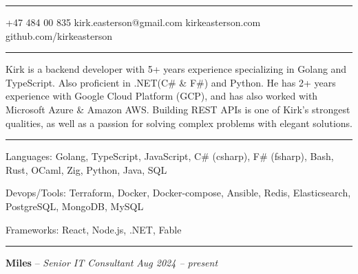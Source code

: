 \documentclass[10pt,letterpaper]{article}
\begin{document}
\begin{center}\hrule\end{center}


\noindent {} \hfill \small +47 484 00 835 \hfill {} \hfill kirk.easterson@gmail.com \hfill {} \hfill kirkeasterson.com \hfill {} \hfill github.com/kirkeasterson \hfill {}
\begin{center}\hrule\end{center}



Kirk is a backend developer with 5+ years experience specializing in Golang and TypeScript. Also proficient in .NET(C\# \& F\#) and Python. He has 2+ years experience with Google Cloud Platform (GCP), and has also worked with Microsoft Azure \& Amazon AWS. Building REST APIs is one of Kirk's strongest qualities, as well as a passion for solving complex problems with elegant solutions. \\


\begin{center}\hrule\end{center}



\inlineheadsection
{Languages:}
{Golang, TypeScript, JavaScript, C\# (csharp), F\# (fsharp), Bash, Rust, OCaml, Zig, Python, Java, SQL}

\inlineheadsection
{Devops/Tools:}
{Terraform, Docker, Docker-compose, Ansible, Redis, Elasticsearch, PostgreSQL, MongoDB, MySQL}

\inlineheadsection
{Frameworks:}
{React, Node.js, .NET, Fable}

\begin{center}\hrule\end{center}



\headedsection
{\textbf{Miles} -- \textit{Senior IT Consultant}}
{\textit{Aug 2024 -- present}} { \\
}
\end{document}
